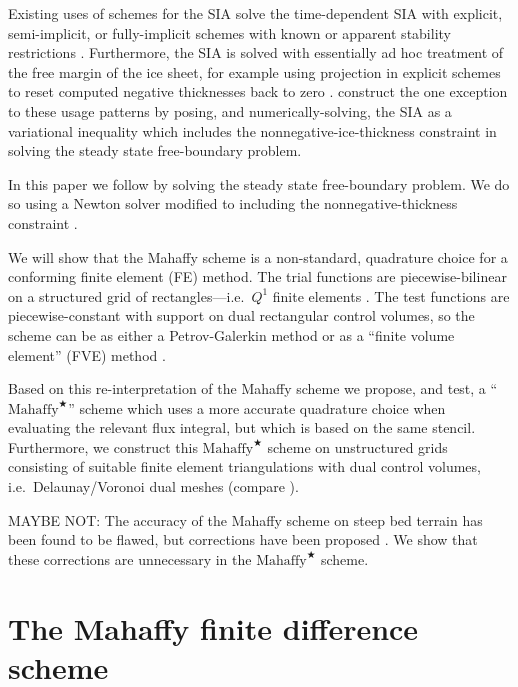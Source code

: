 \documentclass[twocolumn]{igs}
\newcommand{\Mstar}{$\text{Mahaffy}^{\bigstar}$\xspace}
\begin{document}
Existing uses of schemes for the SIA solve the time-dependent SIA with explicit, semi-implicit, or fully-implicit schemes with known or apparent stability restrictions \citep[among others]{Bueleretal2005,EgholmNielsen2010,HindmarshPayne1996,Huybrechtsetal1996,
JaroschSchoofAnslow2013}.  Furthermore, the SIA is solved with essentially ad hoc treatment of the free margin of the ice sheet, for example using projection in explicit schemes to reset computed negative thicknesses back to zero \citep{Bueleretal2005,JaroschSchoofAnslow2013}.  \cite{JouvetBueler2012} construct the one exception to these usage patterns by posing, and numerically-solving, the SIA as a variational inequality which includes the nonnegative-ice-thickness constraint in solving the steady state free-boundary problem.

In this paper we follow \cite{JouvetBueler2012} by solving the steady state free-boundary problem.  We do so using a Newton solver modified to including the nonnegative-thickness constraint \citep{Balayetal2014,BensonMunson2006}.

We will show that the Mahaffy scheme is a non-standard, quadrature choice for a conforming finite element (FE) method.  The trial functions are piecewise-bilinear on a structured grid of rectangles---i.e.~$Q^1$ finite elements \citep{Elmanetal2005}.  The test functions are piecewise-constant with support on dual rectangular control volumes, so the scheme can be as either a Petrov-Galerkin method \citep{Elmanetal2005} or as a ``finite volume element'' (FVE) method \citep{Cai1990,EwingLinLin2002}.

Based on this re-interpretation of the Mahaffy scheme we propose, and test, a ``\Mstar'' scheme which uses a more accurate quadrature choice when evaluating the relevant flux integral, but which is based on the same stencil.  Furthermore, we construct this \Mstar scheme on unstructured grids consisting of suitable finite element triangulations with dual control volumes, i.e.~Delaunay/Voronoi dual meshes (compare \cite{Ringleretal2013}).

MAYBE NOT: The accuracy of the Mahaffy scheme on steep bed terrain has been found to be flawed, but corrections have been proposed \cite{JaroschSchoofAnslow2013}.  We show that these corrections are unnecessary in the \Mstar scheme.


\section{The Mahaffy finite difference scheme}   \label{sec:mahaffyfd}
\end{document}
